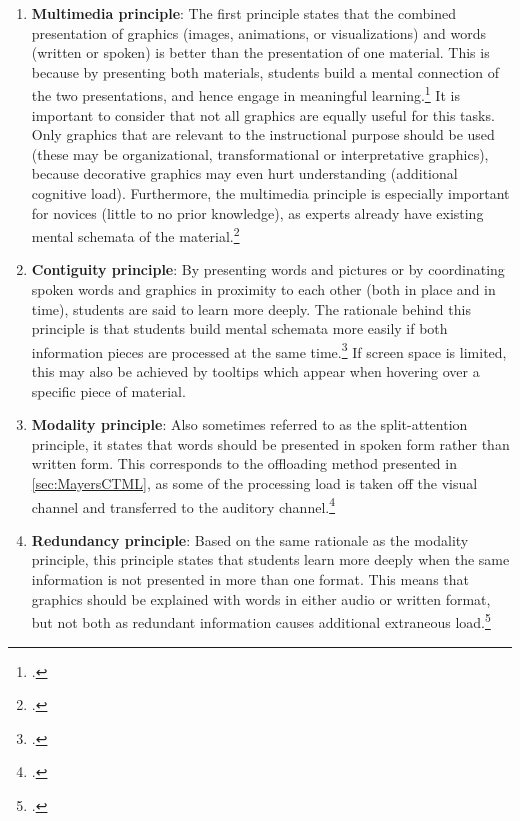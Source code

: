 \begin{enumerate}
    \item \textbf{Multimedia principle}: The first principle states that the combined presentation of graphics (images, animations, or visualizations) and words (written or spoken) is better than the presentation of one material. This is because by presenting both materials, students build a mental connection of the two presentations, and hence engage in meaningful learning.\footcites[Cf.][p.19]{MayerAnimationAidMultimedia2001}[cf.][chapter 4, paragraph 7]{ClarkElearningscienceinstruction2016}[cf.][p.13]{MayerCognitiveTheoryMultimedia1999} It is important to consider that not all graphics are equally useful for this tasks. Only graphics that are relevant to the instructional purpose should be used (these may be organizational, transformational or interpretative graphics), because decorative graphics may even hurt understanding (additional cognitive load). Furthermore, the multimedia principle is especially important for novices (little to no prior knowledge), as experts already have existing mental schemata of the material.\footcites[Cf.][chapter 4, paragraphs 7 et seq]{ClarkElearningscienceinstruction2016}[cf. in addition][]{MayerWhenillustrationworth1990}
    \item \textbf{Contiguity principle}: By presenting words and pictures or by coordinating spoken words and graphics in proximity to each other (both in place and in time), students are said to learn more deeply. The rationale behind this principle is that students build mental schemata more easily if both information pieces are processed at the same time.\footcites[Cf.][p. 19 et seqq]{MayerAnimationAidMultimedia2001}[cf.][chapter 5, paragraphs 1 et seq]{ClarkElearningscienceinstruction2016} If screen space is limited, this may also be achieved by tooltips which appear when hovering over a specific piece of material.
    \item \textbf{Modality principle}: Also sometimes referred to as the split-attention principle, it states that words should be presented in spoken form rather than written form. This corresponds to the offloading method presented in \ref{sec:MayersCTML}, as some of the processing load is taken off the visual channel and transferred to the auditory channel.\footcites[Cf.][p.22]{MayerAnimationAidMultimedia2001}[cf.][p.14]{MayerCognitiveTheoryMultimedia1999}
    \item \textbf{Redundancy principle}: Based on the same rationale as the modality principle, this principle states that students learn more deeply when the same information is not presented in more than one format. This means that graphics should be explained with words in either audio or written format, but not both as redundant information causes additional extraneous load.\footcites[Cf.][chapters 6 and 7]{ClarkElearningscienceinstruction2016}[cf.][p.6]{MayerMultimediaLearning2009}[cf.][p.22]{MayerAnimationAidMultimedia2001}[cf. in addition][]{MayerPrinciplesreducingextraneous2014}

\end{enumerate}
